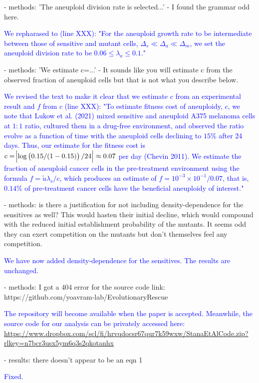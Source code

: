 \documentclass[12pt]{extarticle}
\begin{document}
- methods: 'The aneuploid division rate is selected...' - I found the grammar odd here.

\textcolor{blue}{%
We repharased to (line XXX): "For the aneuploid growth rate to be intermediate between those of sensitive and mutant cells, $\Delta_s\ll\Delta_a\ll\Delta_m$, we set the aneuploid division rate to be $0.06 \le \lambda_a \le 0.1$."
} 

- methods: 'We estimate c=...' - It sounds like you will estimate c from the observed fraction of aneuploid cells but that is not what you describe below.

\textcolor{blue}{%
We revised the text to make it clear that we estimate $c$ from an experimental result and $f$ from $c$ (line XXX): "To estimate fitness cost of aneuploidy, $c$, we note that Lukow et al. (2021) mixed sensitive and aneuploid A375 melanoma cells at $1:1$ ratio, cultured them in a drug-free environment, and observed the ratio evolve as a function of time with the aneuploid cells declining to $15\%$ after 24 days. Thus, our estimate for the fitness cost is $c=\abs{\log\left(0.15/(1-0.15)\right)/24}\approx0.07$ per day (Chevin 2011).
We estimate the fraction of aneuploid cancer cells in the pre-treatment environment using the formula $f=\tilde{u}\lambda_s / c$, which produces an estimate of $f=10^{-3}\times10^{-1}/0.07$, that is, $0.14\%$ of pre-treatment cancer cells have the beneficial aneuploidy of interest."
} 

- methods: is there a justification for not including density-dependence for the sensitives as well? This would hasten their initial decline, which would compound with the reduced initial establishment probability of the mutants. It seems odd they can exert competition on the mutants but don't themselves feel any competition.

\textcolor{blue}{We have now added density-dependence for the sensitives. The results are unchanged.}

- methods: I got a 404 error for the source code link: https://github.com/yoavram-lab/EvolutionaryRescue

\textcolor{blue}{
The repository will become available when the paper is accepted. Meanwhile, the source code for our analysis can be privately accessed here: \url{https://www.dropbox.com/scl/fi/hrvqdocsr67qur7k59wxw/StanaEtAlCode.zip?rlkey=n7bcr3usx5ym6q3s2qkotanhx}
}

- results: there doesn't appear to be an eqn 1

\textcolor{blue}{Fixed.} %
\end{document}
